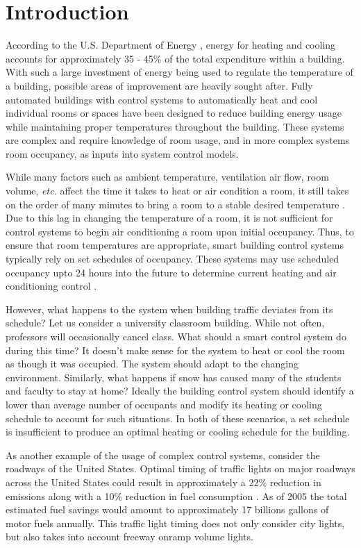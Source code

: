 \chapter{Introduction}
According to the U.S. Department of Energy \cite{DOE2010}, energy for heating and cooling accounts for approximately 35 - 45\% of the total expenditure within a building.  With such a large investment of energy being used to regulate the temperature of a building, possible areas of improvement are heavily sought after.  Fully automated buildings with control systems to automatically heat and cool individual rooms or spaces have been designed \cite{Controls2013, Controls2013a} to reduce building energy usage while maintaining proper temperatures throughout the building.  These systems are complex and require knowledge of room usage, and in more complex systems room occupancy, as inputs into system control models.
	
While many factors such as ambient temperature, ventilation air flow, room volume, \textit{etc.} affect the time it takes to heat or air condition a room, it still takes on the order of many minutes to bring a room to a stable desired temperature \cite{yang2004}.  Due to this lag in changing the temperature of a room, it is not sufficient for control systems to begin air conditioning a room upon initial occupancy.   Thus, to ensure that room temperatures are appropriate, smart building control systems typically rely on set schedules of occupancy.  These systems may use scheduled occupancy upto 24 hours into the future to determine current heating and air conditioning control \cite{Ma2010}.  

However, what happens to the system when building traffic deviates from its schedule?  Let us consider a university classroom building.  While not often, professors will occasionally cancel class.  What should a smart control system do during this time?  It doesn't make sense for the system to heat or cool the room as though it was occupied.  The system should adapt to the changing environment.  Similarly, what happens if snow has caused many of the students and faculty to stay at home?  Ideally the building control system should identify a lower than average number of occupants and modify its heating or cooling schedule to account for such situations.  In both of these scenarios, a set schedule is insufficient to produce an optimal heating or cooling schedule for the building.

As another example of the usage of complex control systems, consider the roadways of the United States.  Optimal timing of traffic lights on major roadways across the United States could result in approximately a 22\% reduction in emissions along with a 10\% reduction in fuel consumption \cite{DOT2007}.  As of 2005 the total estimated fuel savings would amount to approximately 17 billions gallons of motor fuels annually.  This traffic light timing does not only consider city lights, but also takes into account freeway onramp volume lights.

